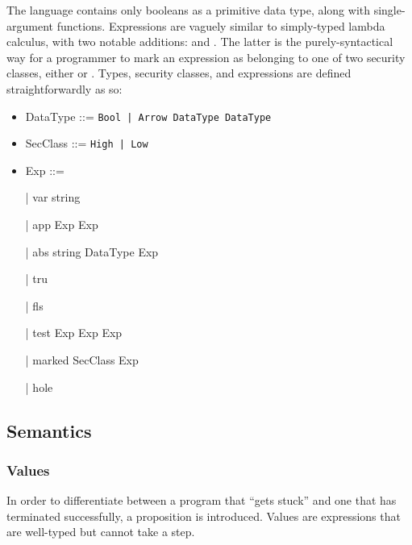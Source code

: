 \documentclass[12pt]{report}
\begin{document}
 The language contains only booleans as a primitive data type,
along with single-argument functions. Expressions are vaguely similar
to simply-typed lambda calculus, with two notable additions: 
and . The latter is the purely-syntactical way for
a programmer to mark an expression as belonging to one of two
security classes, either  or . Types, security classes,
and expressions are defined straightforwardly as so: 




\begin{itemize}
\item  DataType ::= \texttt{Bool | Arrow DataType DataType }


\item  SecClass ::= \texttt{High | Low }


\item  Exp ::=


    | var string


    | app Exp Exp


    | abs string DataType Exp


    | tru


    | fls


    | test Exp Exp Exp


    | marked SecClass Exp


    | hole

\end{itemize}
\begin{coqdoccode}
\coqdocemptyline
\coqdocemptyline
\coqdocemptyline
\coqdocemptyline
\coqdocemptyline
\coqdocemptyline
\coqdocemptyline
\end{coqdoccode}
\subsection{Semantics}



\subsubsection{Values}



 In order to differentiate between a program that ``gets stuck'' and
one that has terminated successfully, a  proposition is
introduced. Values are expressions that are well-typed but cannot
take a step. 
\end{document}
